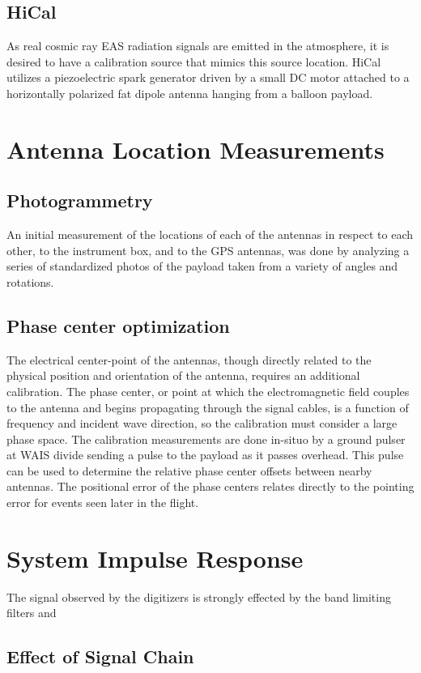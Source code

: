 	\subsection{HiCal}
		As real cosmic ray EAS radiation signals are emitted in the atmosphere, it is desired to have a calibration source that mimics this source location.  HiCal utilizes a piezoelectric spark generator driven by a small DC motor attached to a horizontally polarized fat dipole antenna hanging from a balloon payload.


\section{Antenna Location Measurements}
	\subsection{Photogrammetry}
		An initial measurement of the locations of each of the antennas in respect to each other, to the instrument box, and to the GPS antennas, was done by analyzing a series of standardized photos of the payload taken from a variety of angles and rotations.
		
		
	\subsection{Phase center optimization}
		The electrical center-point of the antennas, though directly related to the physical position and orientation of the antenna, requires an additional calibration.  The phase center, or point at which the electromagnetic field couples to the antenna and begins propagating through the signal cables, is a function of frequency and incident wave direction, so the calibration must consider a large phase space.  The calibration measurements are done in-situo by a ground pulser at WAIS divide sending a pulse to the payload as it passes overhead.  This pulse can be used to determine  the relative phase center offsets between nearby antennas.  The positional error of the phase centers relates directly to the pointing error for events seen later in the flight.

\section{System Impulse Response}
		The signal observed by the digitizers is strongly effected by the band limiting filters and 
	\subsection{Effect of Signal Chain}
	
